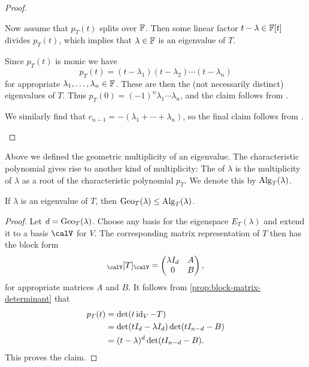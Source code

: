 \begin{proof}
\begin{proofsec*}
    \item[\itemref{enum:eigenvalue-existence}]
    Now assume that $p_T(t)$ splits over $\mathbb{F}$. Then some linear factor $t-\lambda \in \mathbb{F}[t]$ divides $p_T(t)$, which implies that $\lambda \in \mathbb{F}$ is an eigenvalue of $T$.
    
    \item[\itemref{enum:eigenvalue-product}]
    Since $p_T(t)$ is monic we have
    \begin{equation*}
        p_T(t)
            = (t - \lambda_1) (t - \lambda_2) \cdots (t - \lambda_n)
    \end{equation*}
    for appropriate $\lambda_1, \ldots, \lambda_n \in \mathbb{F}$. These are then the (not necessarily distinct) eigenvalues of $T$. Thus $p_T(0) = (-1)^n \lambda_1 \cdots \lambda_n$, and the claim follows from .

    \item[\itemref{enum:eigenvalue-sum}]
    We similarly find that $c_{n-1} = -(\lambda_1 + \cdots + \lambda_n)$, so the final claim follows from .
\end{proofsec*}
\end{proof}


Above we defined the geometric multiplicity of an eigenvalue. The characteristic polynomial gives rise to another kind of multiplicity: The  of $\lambda$ is the multiplicity of $\lambda$ as a root of the characteristic polynomial $p_T$. We denote this by $\mathrm{Alg}_T(\lambda)$.

\begin{proposition}
    If $\lambda$ is an eigenvalue of $T$, then $\mathrm{Geo}_T(\lambda) \leq \mathrm{Alg}_T(\lambda)$.
\end{proposition}

\begin{proof}
    Let $d = \mathrm{Geo}_T(\lambda)$. Choose any basis for the eigenspace $E_T(\lambda)$ and extend it to a basis $\calV$ for $V$. The corresponding matrix representation of $T$ then has the block form
    \begin{equation*}
        \mr{\calV}{T}{\calV} =
        \begin{pmatrix}
            \lambda I_d & A \\
            0 & B
        \end{pmatrix},
    \end{equation*}
    for appropriate matrices $A$ and $B$. It follows from \cref{prop:block-matrix-determinant} that
    \begin{align*}
        p_T(t)
            &= \det(t \operatorname{id}_V - T) \\
            &= \det(t I_d - \lambda I_d) \det(t I_{n-d} - B) \\
            &= (t - \lambda)^d \det(t I_{n-d} - B).
    \end{align*}
    This proves the claim.
\end{proof}


